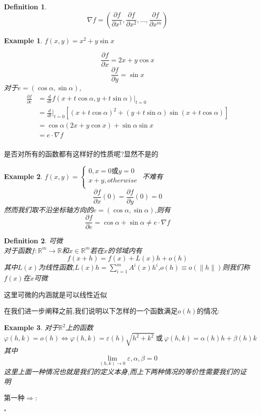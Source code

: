 \documentclass[11pt,hyperref,a4paper,UTF8]{ctexart}
\newtheorem{example}{Example}[subsection]
\newtheorem{definition}{Definition}[subsection]
\newenvironment{cproof}{%
\heiti{证明}\kaishu
}{%
  \hfill $\square$
  \par\bigskip
}
\newcommand{\RR}{\mathbb{R}}
\newcommand{\parameter}[1]{\left(#1\right)}
\newcommand{\bracket}[1]{\left[#1\right]}
\begin{document}
\begin{CJK}{UTF8}{gkai}
\begin{definition}
  \[\nabla f = \parameter{\frac{\partial f}{\partial x^1},\frac{\partial f}{\partial x^2},\ldots,\frac{\partial f}{\partial x^m}}\]
\end{definition}

\begin{example}
  $f(x,y) = x^2 + y \sin x$

  \[\frac{\partial f}{\partial x} = 2x + y \cos x\]
  \[\frac{\partial f}{\partial y} = \sin x\]
  对于$e = (\cos \alpha,\sin \alpha)$,
  \[
    \begin{aligned}
      \frac{\partial f}{\partial e} &= \frac{d}{dt}f(x + t\cos \alpha,y + t\sin \alpha)|_{t = 0}\\
      &= \frac{d}{dt}|_{t = 0} \bracket{(x + t\cos \alpha)^2 + (y + t\sin \alpha) \sin (x + t\cos \alpha)}  \\
      &= \cos \alpha (2x + y \cos x) + \sin \alpha \sin x\\
      &= e\cdot \nabla f\\  
    \end{aligned}
    \]
\end{example}
是否对所有的函数都有这样好的性质呢?显然不是的
\begin{example}
  $f(x,y) = \begin{cases}
    0,x = 0 \text{或} y = 0\\
    x + y, otherwise\\
  \end{cases}$
  不难有
  \[\frac{\partial f}{\partial x}(0) = \frac{\partial f}{\partial y}(0) = 0\]
  然而我们取不沿坐标轴方向的$e = (\cos \alpha,\sin \alpha)$,则有
  \[\frac{\partial f}{\partial e} = \cos \alpha + \sin \alpha \neq e\cdot \nabla f\]
\end{example}

\begin{definition}
  可微\\

  对于函数$f:\RR^m\to \RR$和$x \in \RR^m$若在$x$的邻域内有
  \[f(x+h) = f(x) + L(x) h + o(h)\]
  其中$L(x)$为线性函数,$L(x) h = \sum_{i = 1}^{m} A^i(x) h^i$,$o(h) \equiv o(\|h\|)$则我们称$f(x)$在$x$可微
\end{definition}
  这里可微的内涵就是可以线性近似

  在我们进一步阐释之前,我们说明以下怎样的一个函数满足$o(h)$的情况:

\begin{example}
  对于$\RR^2$上的函数
  \[\varphi(h,k) = o(h) \Leftrightarrow \varphi(h,k) = \varepsilon(h) \sqrt{h^2 + k^2}~\text{或}~\varphi(h,k) = \alpha(h)h + \beta(h)k\]
  其中
  \[\lim_{(h,k)\to 0} \varepsilon,\alpha,\beta = 0\]
  这里上面一种情况也就是我们的定义本身,而上下两种情况的等价性需要我们的证明
\end{example}
\begin{cproof}
  第一种$\Rightarrow$:


\end{cproof}
\end{CJK}
\end{document}
